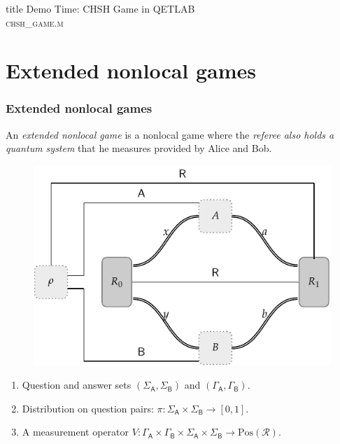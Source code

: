 \documentclass{beamer}
\def\R{\mathcal{R}}
\def \GammaA{\Gamma_{\reg{A}}}
\def \GammaB{\Gamma_{\reg{B}}}
\def \SigmaA{\Sigma_{\reg{A}}}
\def \SigmaB{\Sigma_{\reg{B}}}
\newcommand{\setft}[1]{\mathrm{#1}}
\newcommand{\Pos}{\setft{Pos}}
\newcommand{\reg}[1]{\mathsf{#1}}
\begin{document}
\begin{frame} [noframenumbering]
  \vfill
  \centering
  \begin{beamercolorbox}[sep=8pt,center,shadow=true,rounded=true]{title}
    Demo Time: CHSH Game in QETLAB \\ \textsc{chsh\_game.m}
  \end{beamercolorbox}
  \vfill
\end{frame}
    

  \section{Extended nonlocal games}

\begin{frame}
	\frametitle{Extended nonlocal games}
	An \emph{extended nonlocal game} is a nonlocal game where the \emph{referee also holds a quantum system} that he measures provided by Alice and Bob. 
	\begin{figure}[!htpb] \label{fig:extended-nonlocal-game}
	\begin{center}
		\includegraphics[scale=0.7]{figures/enlg_2.pdf}
	\end{center}
\end{figure}
	\begin{enumerate}
		\item Question and answer sets $(\SigmaA,\SigmaB)$ and $(\GammaA,\GammaB)$. \vspace{1mm}		
		\item Distribution on question pairs: $\pi: \SigmaA \times \SigmaB \rightarrow [0,1]$.\vspace{1mm}
		\item A measurement operator $V: \GammaA \times \GammaB \times \SigmaA \times \SigmaB \rightarrow \Pos(\R)$.
	\end{enumerate}
\end{frame}
\end{document}

